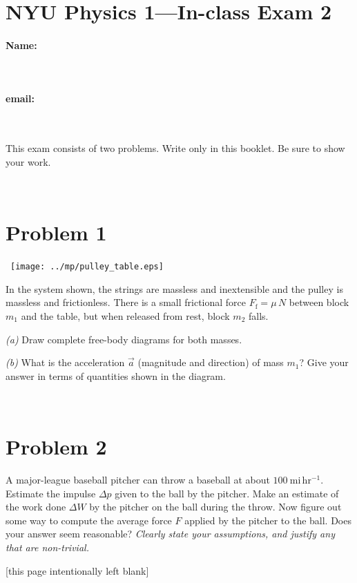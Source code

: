 \documentclass[12pt]{article}
\begin{document}
\section*{NYU Physics 1---In-class Exam 2}

\vfill

\paragraph{Name:} ~

\paragraph{email:} ~

\vfill

This exam consists of two problems.  Write only in this booklet.  Be
sure to show your work.

\vfill ~

\clearpage

\section*{Problem 1}

\noindent~\hfill\texttt{[image: ../mp/pulley\_table.eps]}\hfill~

In the system shown, the strings are massless and inextensible and the
pulley is massless and frictionless.  There is a small frictional
force $F_\mathrm{f}=\mu\,N$ between block $m_1$ and the table, but
when released from rest, block $m_2$ falls.

\textsl{(a)} Draw complete free-body diagrams for both masses.

\vfill

\textsl{(b)} What is the acceleration $\vec{a}$ (magnitude and
direction) of mass $m_1$?  Give your answer in terms of quantities
shown in the diagram.

\vfill ~

\clearpage

\section*{Problem 2}

A major-league baseball pitcher can throw a baseball at about
$100~\mathrm{mi\,hr^{-1}}$.  Estimate the impulse $\Delta p$ given to
the ball by the pitcher.  Make an estimate of the work done $\Delta W$
by the pitcher on the ball during the throw.  Now figure out some way
to compute the average force $F$ applied by the pitcher to the ball.
Does your answer seem reasonable?  \emph{Clearly state your
assumptions, and justify any that are non-trivial.}

\clearpage

[this page intentionally left blank]
\end{document}
